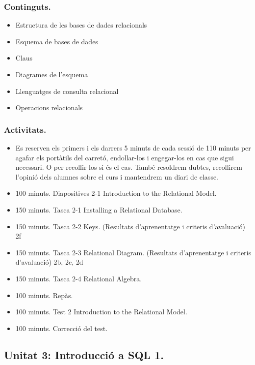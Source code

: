 \documentclass[catalan, a4paper, 12pt, titlepage]{article}
\begin{document}
  \subsubsection{Continguts.}

  \begin{itemize}
	  \item Estructura de les bases de dades relacionals
	  \item Esquema de bases de dades
	  \item Claus
	  \item Diagrames de l'esquema
	  \item Llenguatges de consulta relacional
	  \item Operacions relacionals
  \end{itemize}

  \subsubsection{Activitats.}

  \begin{itemize}
          \item Es reserven els primers i els darrers 5 minuts de cada sessió de 110 minuts per agafar els portàtils del carretó, endollar-los i engegar-los en cas que sigui necessari. O per recollir-los si és el cas. També resoldrem dubtes, recollirem l'opinió dels alumnes sobre el curs i mantendrem un diari de classe.
          \item 100 minuts. Diapositives 2-1 Introduction to the Relational Model.
	  \item 150 minuts. Tasca 2-1 Installing a Relational Database.
	  \item 150 minuts. Tasca 2-2 Keys. (\faGraduationCap Resultats d'aprenentatge i criteris d'avaluació) 2f
	  \item 150 minuts. Tasca 2-3 Relational Diagram. (\faGraduationCap Resultats d'aprenentatge i criteris d'avaluació) 2b, 2c, 2d
	  \item 150 minuts. Tasca 2-4 Relational Algebra.
	  \item 100 minuts. Repàs.
	  \item 100 minuts. Test 2 Introduction to the Relational Model.
	  \item 100 minuts. Correcció del test.
  \end{itemize}

  \subsection{Unitat 3: Introducció a SQL 1.}
\end{document}
